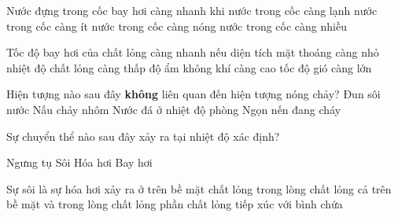 \begin{ex}
	Nước đựng trong cốc bay hơi càng nhanh khi
	\choice
	{nước trong cốc càng lạnh}
	{nước trong cốc càng ít}
	{\True nước trong cốc càng nóng}
	{nước trong cốc càng nhiều}
	\end{ex}








\begin{ex} 
	Tốc độ bay hơi của chất lỏng càng nhanh nếu
	\choice
	{diện tích mặt thoáng càng nhỏ}
	{nhiệt độ chất lỏng càng thấp}
	{độ ẩm không khí càng cao}
	{\True tốc độ gió càng lớn}
\end{ex}


\begin{ex}
	Hiện tượng nào sau đây \textbf{không} liên quan đến hiện tượng nóng chảy?
	\choice
	{\True Đun sôi nước}
	{Nấu chảy nhôm}
	{Nước đá ở nhiệt độ phòng}
	{Ngọn nến đang cháy}
	\end{ex}


\begin{ex}
	Sự chuyển thể nào sau đây xảy ra tại nhiệt độ xác định?
	
	\choice
	{Ngưng tụ}
	{\True Sôi}
	{Hóa hơi}
	{Bay hơi}
	\end{ex}


\begin{ex} 
	Sự sôi là sự hóa hơi xảy ra ở
	\choice
	{trên bề mặt chất lỏng}
	{trong lòng chất lỏng}
	{\True cả trên bề mặt và trong lòng chất lỏng}
	{phần chất lỏng tiếp xúc với bình chứa}
\end{ex}

